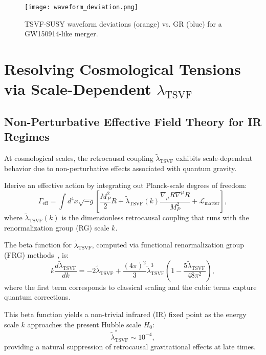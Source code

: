 \documentclass[twocolumn,superscriptaddress,floatfix]{revtex4-2}
\begin{document}
\begin{figure}[!htbp]  
\centering  
\texttt{[image: waveform\_deviation.png]}  
\caption{TSVF-SUSY waveform deviations (orange) vs. GR (blue) for a GW150914-like merger.}  
\label{fig:waveform_deviation}  
\end{figure}  

\section{Resolving Cosmological Tensions via Scale-Dependent \texorpdfstring{$\lambda_{\text{TSVF}}$}{lambda-TSVF}}
\label{sec:cosmo_tensions}

\subsection{Non-Perturbative Effective Field Theory for IR Regimes}
\label{subsec:eft_ir}

At cosmological scales, the retrocausal coupling \(\tilde{\lambda}_{\text{TSVF}}\) exhibits scale-dependent behavior due to non-perturbative effects associated with quantum gravity.

Iderive an effective action by integrating out Planck-scale degrees of freedom:
\begin{equation}
\Gamma_{\text{eff}} = \int d^4x \sqrt{-g} \left[ \frac{M_P^2}{2}R + \tilde{\lambda}_{\text{TSVF}}(k) \frac{\nabla_\mu R \nabla^\mu R}{M_P^2} + \mathcal{L}_{\text{matter}} \right],
\label{eq:eft_action}
\end{equation}
where \(\tilde{\lambda}_{\text{TSVF}}(k)\) is the dimensionless retrocausal coupling that runs with the renormalization group (RG) scale \(k\).

The beta function for \(\tilde{\lambda}_{\text{TSVF}}\), computed via functional renormalization group (FRG) methods~\cite{Reuter:1998}, is:
\begin{equation}
k \frac{d\tilde{\lambda}_{\text{TSVF}}}{dk} = -2\tilde{\lambda}_{\text{TSVF}} + \frac{(4\pi)^2}{3}\tilde{\lambda}_{\text{TSVF}}^3 \left(1 - \frac{5\tilde{\lambda}_{\text{TSVF}}}{48\pi^2}\right),
\label{eq:beta_lambda}
\end{equation}
where the first term corresponds to classical scaling and the cubic terms capture quantum corrections.

This beta function yields a non-trivial infrared (IR) fixed point as the energy scale \(k\) approaches the present Hubble scale \(H_0\):
\[
\tilde{\lambda}_{\text{TSVF}}^{*} \sim 10^{-4},
\]
providing a natural suppression of retrocausal gravitational effects at late times.
\end{document}
